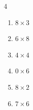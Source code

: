 \begin{multicols}{4}
\begin{enumerate}
  \item $8\times 3$
        \phantom{$=24$}

  \item $6\times 8$
        \phantom{$=48$}

  \item $4\times 4$
        \phantom{$=16$}

  \item $0\times 6$
        \phantom{$=0$}

  \item $8\times 2$
        \phantom{$=16$}

  \item $7\times 6$
        \phantom{$=42$}

\end{enumerate}
\end{multicols}

\newpage
\resetdrill

